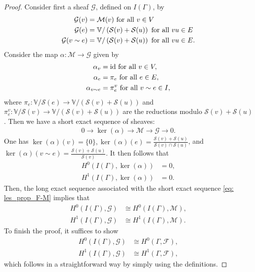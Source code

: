 \documentclass{article}
\theoremstyle{definition}
\theoremstyle{remark}
\begin{document}
\begin{proof} Consider first a sheaf $\mathcal{G}$, defined on $I(\Gamma)$, by
    \begin{align*}
        \mathcal{G}(v) &= \mathcal{M}(v) \textup{ for all }v\in V\\
        \mathcal{G}(e) &= \mathbb{V}/\left( \mathcal{S}(v) +\mathcal{S}(u)\right)\textup{ for all } vu\in E \\
        \mathcal{G}(v\sim e) &= \mathbb{V}/\left( \mathcal{S}(v) +\mathcal{S}(u)\right)\textup{ for all } vu\in E.
    \end{align*}
    Consider the map $\alpha: \mathcal{M} \rightarrow \mathcal{G}$ given by
    \begin{align*}
        \alpha_v &= \textup{id} \textup{ for all }v\in V,\\
        \alpha_e &= \pi_e \textup{ for all } e\in E,\\
        \alpha_{v \sim e} &= \pi^{v}_e \textup{ for all } v\sim e \in I,
    \end{align*}
where $\pi_e: \mathbb{V}/\mathcal{S}(e)  \rightarrow \mathbb{V}/\left( \mathcal{S}(v) +\mathcal{S}(u)\right)$ and $\pi^{v}_e: \mathbb{V}/\mathcal{S}(v) \rightarrow \mathbb{V}/\left( \mathcal{S}(v) +\mathcal{S}(u)\right)$ are the reductions modulo $\mathcal{S}(v) +\mathcal{S}(u)$. Then we have a short exact sequence of sheaves:
\begin{align}\label{eq: les_prop_F-M}
    0\rightarrow \ker(\alpha) \rightarrow \mathcal{M} \rightarrow\mathcal{G} \rightarrow 0.
\end{align}
One has $\ker(\alpha)(v) = \{0\}, \ker(\alpha)(e) = \frac{\mathcal{S}(v) + \mathcal{S}(u) }{\mathcal{S}(v) \cap \mathcal{S}(u)}$, and $ \ker(\alpha)(v \sim e) = \frac{\mathcal{S}(v) + \mathcal{S}(u)}{\mathcal{S}(v)}$.  It then follows that
        \begin{align*}
        H^{0}(I(\Gamma), \ker(\alpha))&= 0,\\
        H^{1}(I(\Gamma), \ker(\alpha))&= 0.
    \end{align*}
Then, the long exact sequence associated with the short exact sequence \eqref{eq: les_prop_F-M} implies that
        \begin{align*}
        H^{0}(I(\Gamma), \mathcal{G})&\cong H^{0}(I(\Gamma), \mathcal{M}),\\
        H^{1}(I(\Gamma), \mathcal{G})&\cong H^{1}(I(\Gamma),  \mathcal{M}).
    \end{align*}
To finish the proof, it suffices to show 
\begin{align*}
     H^{0}(I(\Gamma), \mathcal{G})&\cong H^{0}(\Gamma, \mathcal{F}),\\
    H^{1}(I(\Gamma), \mathcal{G})&\cong H^{1}(\Gamma, \mathcal{F}),
\end{align*}
which follows in a straightforward way by simply using the definitions. 
\end{proof}
\end{document}
